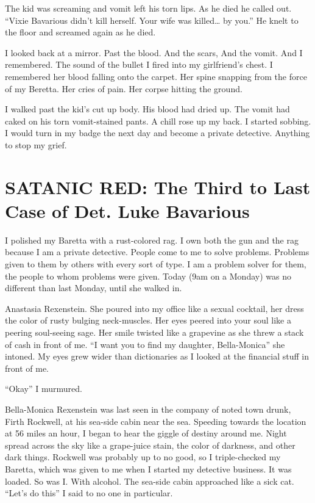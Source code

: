 The kid was screaming and vomit left his torn lips. As he died he
called out. ``Vixie Bavarious didn't kill herself. Your
wife was killed{\ldots} by you.'' He knelt to the floor and
screamed again as he died.

I looked back at a mirror. Past the blood. And the scars, And the
vomit. And I remembered. The sound of the bullet I fired into my
girlfriend's chest. I remembered her blood falling onto the
carpet. Her spine snapping from the force of my Beretta. Her cries
of pain. Her corpse hitting the ground.

I walked past the kid's cut up body. His blood had dried up.
The vomit had caked on his torn vomit-stained pants. A chill rose
up my back. I started sobbing. I would turn in my badge the next
day and become a private detective. Anything to stop my
grief.


 





\chapter{SATANIC RED: The Third to Last Case of Det. Luke
Bavarious}





I polished my Baretta with a rust-colored rag. I own both the gun
and the rag because I am a private detective. People come to me to
solve problems. Problems given to them by others with every sort of
type. I am a problem solver for them, the people to whom problems
were given. Today (9am on a Monday) was no different than last
Monday, until she walked in.



Anastasia Rexenstein. She poured into my office like a sexual
cocktail, her dress the color of rusty bulging neck-muscles. Her
eyes peered into your soul like a peering soul-seeing sage. Her
smile twisted like a grapevine as she threw a stack of cash in
front of me. ``I want you to find my daughter,
Bella-Monica'' she intoned. My eyes grew wider than
dictionaries as I looked at the financial stuff in front of
me.



``Okay'' I murmured.



Bella-Monica Rexenstein was last seen in the company of noted town
drunk, Firth Rockwell, at his sea-side cabin near the sea. Speeding
towards the location at 56 miles an hour, I began to hear the
giggle of destiny around me. Night spread across the sky like a
grape-juice stain, the color of darkness, and other dark things.
Rockwell was probably up to no good, so I triple-checked my
Baretta, which was given to me when I started my detective
business. It was loaded. So was I. With alcohol. The sea-side cabin
approached like a sick cat. ``Let's do this'' I said to
no one in particular.



